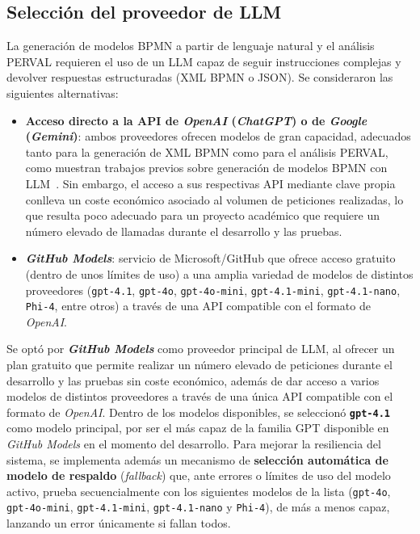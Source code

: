 {%
\subsection{Selección del proveedor de LLM}
\label{subsec:seleccionLLM}

La generación de modelos BPMN a partir de lenguaje natural y el análisis PERVAL requieren el uso de un LLM capaz de seguir instrucciones complejas y devolver respuestas estructuradas (XML BPMN o JSON). Se consideraron las siguientes alternativas:

\begin{itemize}
    \item \textbf{Acceso directo a la API de \textit{OpenAI} (\textit{ChatGPT}) o de \textit{Google} (\textit{Gemini})}: ambos proveedores ofrecen modelos de gran capacidad, adecuados tanto para la generación de XML BPMN como para el análisis PERVAL, como muestran trabajos previos sobre generación de modelos BPMN con LLM~\cite{kourani2025evaluating,bise2025bpmn}. Sin embargo, el acceso a sus respectivas API mediante clave propia conlleva un coste económico asociado al volumen de peticiones realizadas, lo que resulta poco adecuado para un proyecto académico que requiere un número elevado de llamadas durante el desarrollo y las pruebas.
    \item \textbf{\textit{GitHub Models}}: servicio de Microsoft/GitHub que ofrece acceso gratuito (dentro de unos límites de uso) a una amplia variedad de modelos de distintos proveedores (\texttt{gpt-4.1}, \texttt{gpt-4o}, \texttt{gpt-4o-mini}, \texttt{gpt-4.1-mini}, \texttt{gpt-4.1-nano}, \texttt{Phi-4}, entre otros) a través de una API compatible con el formato de \textit{OpenAI}.
\end{itemize}

Se optó por \textbf{\textit{GitHub Models}} como proveedor principal de LLM, al ofrecer un plan gratuito que permite realizar un número elevado de peticiones durante el desarrollo y las pruebas sin coste económico, además de dar acceso a varios modelos de distintos proveedores a través de una única API compatible con el formato de \textit{OpenAI}. Dentro de los modelos disponibles, se seleccionó \textbf{\texttt{gpt-4.1}} como modelo principal, por ser el más capaz de la familia GPT disponible en \textit{GitHub Models} en el momento del desarrollo. Para mejorar la resiliencia del sistema, se implementa además un mecanismo de \textbf{selección automática de modelo de respaldo} (\textit{fallback}) que, ante errores o límites de uso del modelo activo, prueba secuencialmente con los siguientes modelos de la lista (\texttt{gpt-4o}, \texttt{gpt-4o-mini}, \texttt{gpt-4.1-mini}, \texttt{gpt-4.1-nano} y \texttt{Phi-4}), de más a menos capaz, lanzando un error únicamente si fallan todos.


}
